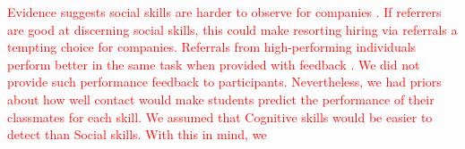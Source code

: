 \documentclass[11pt,a4paper,oneside]{article}
\begin{document}
\textcolor{red}{Evidence suggests social skills are harder to observe for companies \citep{bassi2022screening}. If referrers are good at discerning social skills, this could make resorting hiring via referrals a tempting choice for companies.  Referrals from high-performing individuals perform better in the same task when provided with feedback \citep{beaman_who_2012, beaman_job_2018,pallais_why_2016}. We did not provide such performance feedback to participants. Nevertheless, we had priors about how well contact would make students predict the performance of their classmates for each skill. We assumed that Cognitive skills would be easier to detect than Social skills.  With this in mind, we }




\end{document}
